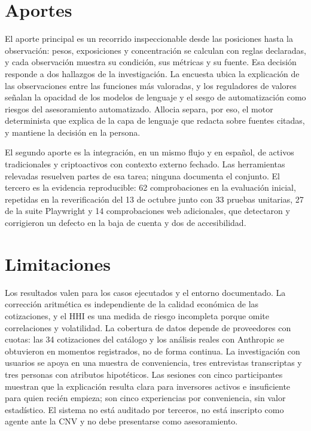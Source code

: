 \section*{Aportes}

El aporte principal es un recorrido inspeccionable desde las posiciones hasta la observación: pesos, exposiciones y concentración se calculan con reglas declaradas, y cada observación muestra su condición, sus métricas y su fuente. Esa decisión responde a dos hallazgos de la investigación. La encuesta ubica la explicación de las observaciones entre las funciones más valoradas, y los reguladores de valores señalan la opacidad de los modelos de lenguaje y el sesgo de automatización como riesgos del asesoramiento automatizado. Allocia separa, por eso, el motor determinista que explica de la capa de lenguaje que redacta sobre fuentes citadas, y mantiene la decisión en la persona.

El segundo aporte es la integración, en un mismo flujo y en español, de activos tradicionales y criptoactivos con contexto externo fechado. Las herramientas relevadas resuelven partes de esa tarea; ninguna documenta el conjunto. El tercero es la evidencia reproducible: 62 comprobaciones en la evaluación inicial, repetidas en la reverificación del 13 de octubre junto con 33 pruebas unitarias, 27 de la suite Playwright y 14 comprobaciones web adicionales, que detectaron y corrigieron un defecto en la baja de cuenta y dos de accesibilidad.

\section*{Limitaciones}

Los resultados valen para los casos ejecutados y el entorno documentado. La corrección aritmética es independiente de la calidad económica de las cotizaciones, y el HHI es una medida de riesgo incompleta porque omite correlaciones y volatilidad. La cobertura de datos depende de proveedores con cuotas: las 34 cotizaciones del catálogo y los análisis reales con Anthropic se obtuvieron en momentos registrados, no de forma continua. La investigación con usuarios se apoya en una muestra de conveniencia, tres entrevistas transcriptas y tres personas con atributos hipotéticos. Las sesiones con cinco participantes muestran que la explicación resulta clara para inversores activos e insuficiente para quien recién empieza; son cinco experiencias por conveniencia, sin valor estadístico. El sistema no está auditado por terceros, no está inscripto como agente ante la CNV y no debe presentarse como asesoramiento.

